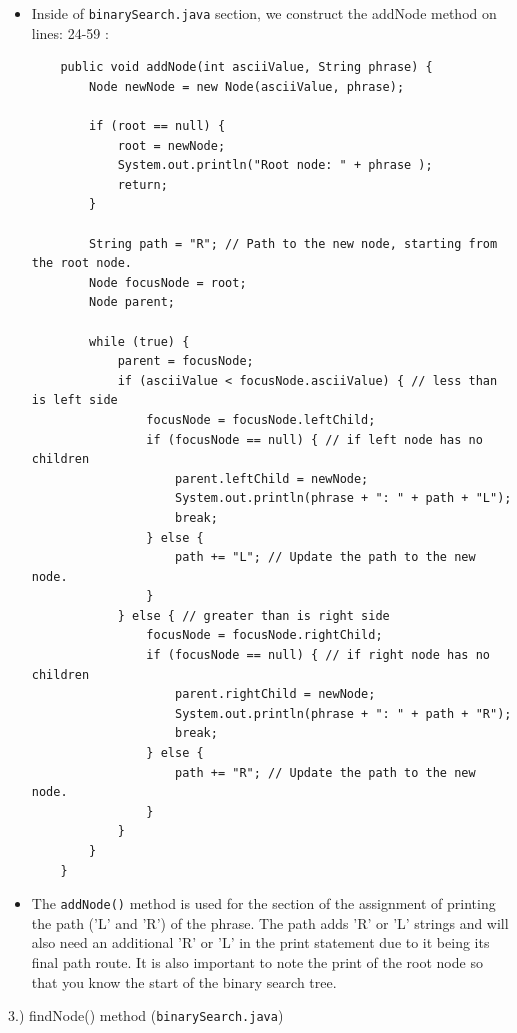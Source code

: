 \documentclass{article}
\begin{document}
\begin{itemize}
\item Inside of \verb|binarySearch.java| section, we construct the addNode method on lines: 24-59 :

\begin{verbatim}
    public void addNode(int asciiValue, String phrase) {
        Node newNode = new Node(asciiValue, phrase);

        if (root == null) {
            root = newNode;
            System.out.println("Root node: " + phrase );
            return;
        }

        String path = "R"; // Path to the new node, starting from the root node.
        Node focusNode = root;
        Node parent;

        while (true) {
            parent = focusNode;
            if (asciiValue < focusNode.asciiValue) { // less than is left side
                focusNode = focusNode.leftChild;
                if (focusNode == null) { // if left node has no children
                    parent.leftChild = newNode;
                    System.out.println(phrase + ": " + path + "L");
                    break;
                } else {
                    path += "L"; // Update the path to the new node.
                }
            } else { // greater than is right side
                focusNode = focusNode.rightChild;
                if (focusNode == null) { // if right node has no children
                    parent.rightChild = newNode;
                    System.out.println(phrase + ": " + path + "R");
                    break;
                } else {
                    path += "R"; // Update the path to the new node.
                }
            }
        }
    }
\end{verbatim}
\item The \verb|addNode()| method is used for the section of the assignment of printing the path ('L' and 'R') of the phrase. The path adds 'R' or 'L' strings and will also need an additional 'R' or 'L' in the print statement due to it being its final path route. It is also important to note the print of the root node so that you know the start of the binary search tree.  \\

\end{itemize}


\begin{large}
    3.) findNode() method (\verb|binarySearch.java|)
\end{large}
\end{document}
